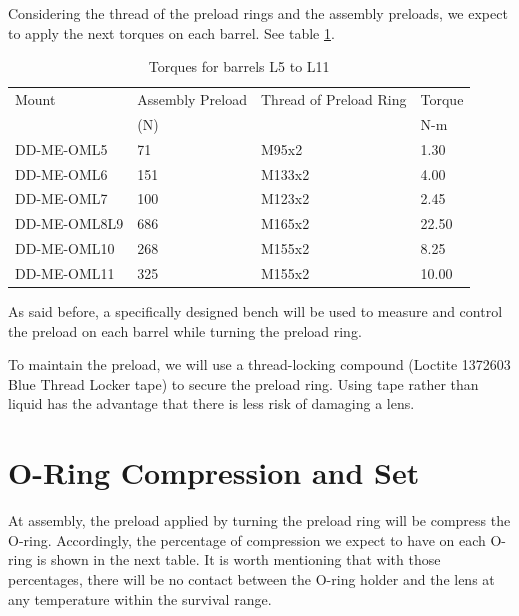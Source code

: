 \documentclass{report}
\begin{document}
Considering the thread of the preload rings and the assembly preloads, we expect to apply the next torques on each barrel. See table \ref{table:torquesL5L11}.

\begin{table}
\caption{Torques for barrels L5 to L11}
\label{table:torquesL5L11}
\begin{center}
\small
\begin{tabular}{llll}
\hline
\hline
Mount	&	Assembly Preload
	&	Thread of Preload Ring	&	Torque
	\\
	&	(N)	&		&	N-m	\\
	\hline
DD-ME-OML5	&	71	&	M95x2	&	1.30	\\
DD-ME-OML6	&	151	&	M133x2	&	4.00	\\
DD-ME-OML7	&	100	&	M123x2	&	2.45	\\
DD-ME-OML8L9	&	686	&	M165x2	&	22.50	\\
DD-ME-OML10	&	268	&	M155x2	&	8.25	\\
DD-ME-OML11	&	325	&	M155x2	&	10.00	\\
\hline
\end{tabular}
\end{center}
\end{table}

As said before, a specifically designed bench will be used to measure and control the preload on each barrel while turning the preload ring.

To maintain the preload, we will use a thread-locking compound (Loctite 1372603 Blue Thread Locker tape) to secure the preload ring. Using tape rather than liquid has the advantage that there is less risk of damaging a lens.

\section{O-Ring Compression and Set}
 
At assembly, the preload applied by turning the preload ring will be compress the O-ring. Accordingly, the percentage of compression we expect to have on each O-ring is shown in the next table. It is worth mentioning that with those percentages, there will be no contact between the O-ring holder and the lens at any temperature within the survival range.
\end{document}

